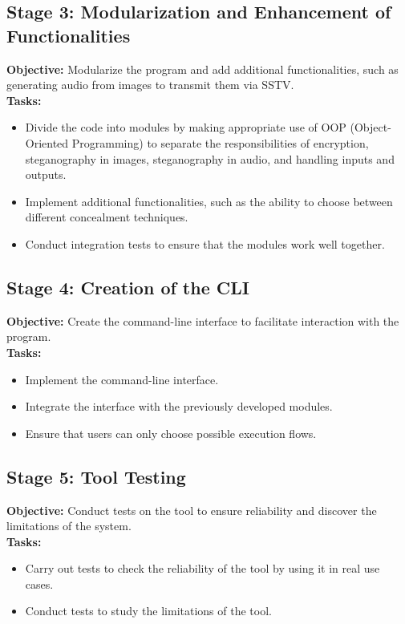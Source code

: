 \subsection{Stage 3: Modularization and Enhancement of Functionalities}
\textbf{Objective:} Modularize the program and add additional functionalities, such as generating audio from images to transmit them via SSTV.\\

\textbf{Tasks:}
\begin{itemize}
    \item Divide the code into modules by making appropriate use of OOP (Object-Oriented Programming) to separate the responsibilities of encryption, steganography in images, steganography in audio, and handling inputs and outputs. 
    \item Implement additional functionalities, such as the ability to choose between different concealment techniques. 
    \item Conduct integration tests to ensure that the modules work well together.  

\end{itemize}

\subsection{Stage 4: Creation of the CLI  }
\textbf{Objective:} Create the command-line interface to facilitate interaction with the program.\\

\textbf{Tasks:}
\begin{itemize}
    \item Implement the command-line interface.  
    \item Integrate the interface with the previously developed modules. 
    \item Ensure that users can only choose possible execution flows.  
\end{itemize}

\subsection{Stage 5: Tool Testing }
\textbf{Objective:} Conduct tests on the tool to ensure reliability and discover the limitations of the system.\\ 

\textbf{Tasks:}
\begin{itemize}
    \item Carry out tests to check the reliability of the tool by using it in real use cases.
    \item Conduct tests to study the limitations of the tool. 
\end{itemize}


